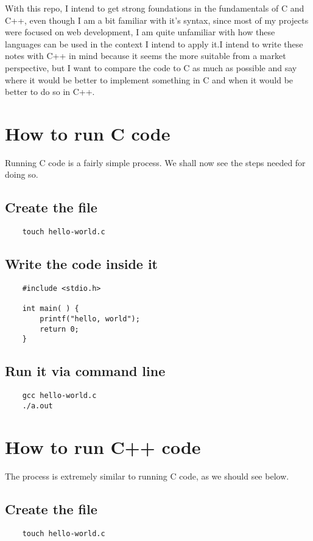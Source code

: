 \documentclass{article}
\begin{document}
With this repo, I intend to get strong foundations in the fundamentals of C and C++, even though I am a bit familiar with it's syntax, since most of my projects were focused on web development, I am quite unfamiliar with how these languages can be used in the context I intend to apply it.I intend to write these notes with C++ in mind because it seems the more suitable from a market perspective, but I want to compare the code to C as much as possible and say where it would be better to implement something in C and when it would be better to do so in C++.

\section{How to run C code}
Running C code is a fairly simple process. We shall now see the steps needed for doing so.

\subsection{Create the file}
\begin{verbatim}
    touch hello-world.c
\end{verbatim}

\subsection{Write the code inside it}
\begin{verbatim}
    #include <stdio.h>

    int main( ) {
        printf("hello, world");
        return 0;
    }
\end{verbatim}

\subsection{Run it via command line}
\begin{verbatim}
    gcc hello-world.c 
    ./a.out 
\end{verbatim}

\section{How to run C++ code}
The process is extremely similar to running C code, as we should see below.

\subsection{Create the file}
\begin{verbatim}
    touch hello-world.c
\end{verbatim}
\end{document}
